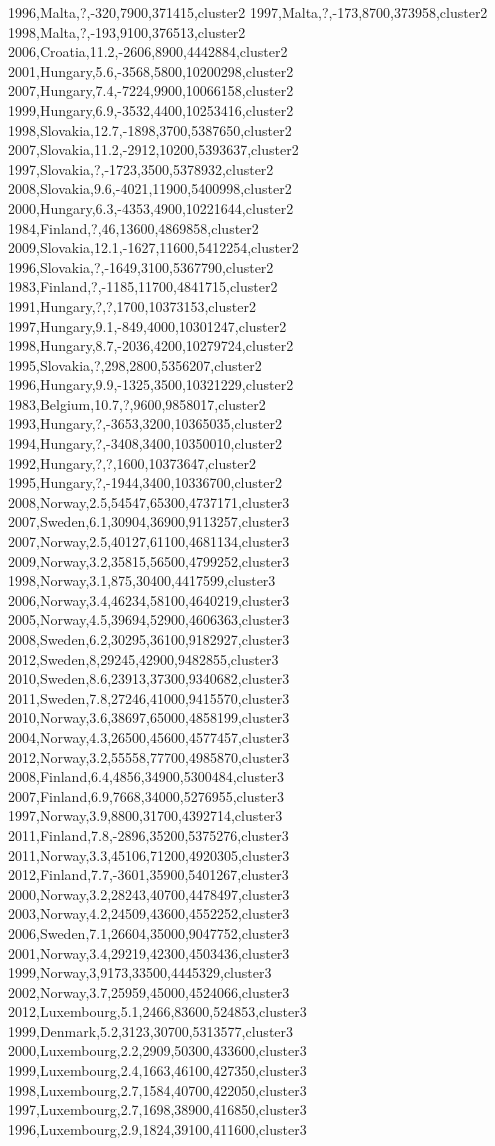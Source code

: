 1996,Malta,?,-320,7900,371415,cluster2
1997,Malta,?,-173,8700,373958,cluster2
1998,Malta,?,-193,9100,376513,cluster2
2006,Croatia,11.2,-2606,8900,4442884,cluster2
2001,Hungary,5.6,-3568,5800,10200298,cluster2
2007,Hungary,7.4,-7224,9900,10066158,cluster2
1999,Hungary,6.9,-3532,4400,10253416,cluster2
1998,Slovakia,12.7,-1898,3700,5387650,cluster2
2007,Slovakia,11.2,-2912,10200,5393637,cluster2
1997,Slovakia,?,-1723,3500,5378932,cluster2
2008,Slovakia,9.6,-4021,11900,5400998,cluster2
2000,Hungary,6.3,-4353,4900,10221644,cluster2
1984,Finland,?,46,13600,4869858,cluster2
2009,Slovakia,12.1,-1627,11600,5412254,cluster2
1996,Slovakia,?,-1649,3100,5367790,cluster2
1983,Finland,?,-1185,11700,4841715,cluster2
1991,Hungary,?,?,1700,10373153,cluster2
1997,Hungary,9.1,-849,4000,10301247,cluster2
1998,Hungary,8.7,-2036,4200,10279724,cluster2
1995,Slovakia,?,298,2800,5356207,cluster2
1996,Hungary,9.9,-1325,3500,10321229,cluster2
1983,Belgium,10.7,?,9600,9858017,cluster2
1993,Hungary,?,-3653,3200,10365035,cluster2
1994,Hungary,?,-3408,3400,10350010,cluster2
1992,Hungary,?,?,1600,10373647,cluster2
1995,Hungary,?,-1944,3400,10336700,cluster2
2008,Norway,2.5,54547,65300,4737171,cluster3
2007,Sweden,6.1,30904,36900,9113257,cluster3
2007,Norway,2.5,40127,61100,4681134,cluster3
2009,Norway,3.2,35815,56500,4799252,cluster3
1998,Norway,3.1,875,30400,4417599,cluster3
2006,Norway,3.4,46234,58100,4640219,cluster3
2005,Norway,4.5,39694,52900,4606363,cluster3
2008,Sweden,6.2,30295,36100,9182927,cluster3
2012,Sweden,8,29245,42900,9482855,cluster3
2010,Sweden,8.6,23913,37300,9340682,cluster3
2011,Sweden,7.8,27246,41000,9415570,cluster3
2010,Norway,3.6,38697,65000,4858199,cluster3
2004,Norway,4.3,26500,45600,4577457,cluster3
2012,Norway,3.2,55558,77700,4985870,cluster3
2008,Finland,6.4,4856,34900,5300484,cluster3
2007,Finland,6.9,7668,34000,5276955,cluster3
1997,Norway,3.9,8800,31700,4392714,cluster3
2011,Finland,7.8,-2896,35200,5375276,cluster3
2011,Norway,3.3,45106,71200,4920305,cluster3
2012,Finland,7.7,-3601,35900,5401267,cluster3
2000,Norway,3.2,28243,40700,4478497,cluster3
2003,Norway,4.2,24509,43600,4552252,cluster3
2006,Sweden,7.1,26604,35000,9047752,cluster3
2001,Norway,3.4,29219,42300,4503436,cluster3
1999,Norway,3,9173,33500,4445329,cluster3
2002,Norway,3.7,25959,45000,4524066,cluster3
2012,Luxembourg,5.1,2466,83600,524853,cluster3
1999,Denmark,5.2,3123,30700,5313577,cluster3
2000,Luxembourg,2.2,2909,50300,433600,cluster3
1999,Luxembourg,2.4,1663,46100,427350,cluster3
1998,Luxembourg,2.7,1584,40700,422050,cluster3
1997,Luxembourg,2.7,1698,38900,416850,cluster3
1996,Luxembourg,2.9,1824,39100,411600,cluster3
